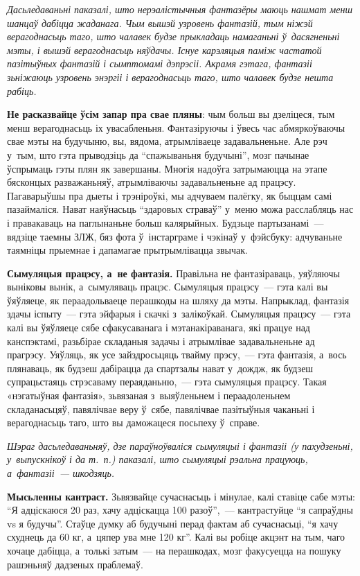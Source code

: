 \emph{Дасьледаваньні паказалі, што нерэалістычныя фантазёры маюць нашмат менш шанцаў дабіцца жаданага. Чым вышэй узровень фантазій, тым ніжэй верагоднасьць таго, што чалавек будзе прыкладаць намаганьні ў~дасягненьні мэты, і вышэй верагоднасьць няўдачы. Існуе карэляцыя паміж частатой пазітыўных фантазій і сымптомамі дэпрэсіі. Акрамя гэтага, фантазіі зьніжаюць узровень энэргіі і верагоднасьць таго, што чалавек будзе нешта рабіць.}

\textbf{Не расказвайце ўсім запар пра свае пляны}: чым больш вы дзеліцеся, тым менш верагоднасьць іх увасабленьня. Фантазіруючы і ўвесь час абмяркоўваючы свае мэты на будучыню, вы, вядома, атрымліваеце задавальненьне. Але рэч у~тым, што гэта прыводзіць да ``спажываньня будучыні'', мозг пачынае ўспрымаць гэты плян як завершаны. Многія надоўга затрымаюцца на этапе бясконцых разважаньняў, атрымліваючы задавальненьне ад працэсу. Пагаварыўшы пра дыеты і трэніроўкі, мы адчуваем палёгку, як быццам самі пазаймаліся. Нават наяўнасьць ``здаровых страваў'' у~меню можа расслабляць нас і правакаваць на паглынаньне больш калярыйных. Будзьце партызанамі~--- вядзіце таемны ЗЛЖ, бяз фота ў~інстарграме і чэкінаў у~фэйсбуку: адчуваньне таямніцы прыемнае і дапамагае прытрымлівацца звычак.

\textbf{Сымуляцыя працэсу, а~не фантазія.} Правільна не фантазіраваць, уяўляючы выніковы вынік, а~сымуляваць працэс. Сымуляцыя працэсу~--- гэта калі вы ўяўляеце, як пераадольваеце перашкоды на шляху да мэты. Напрыклад, фантазія здачы іспыту~--- гэта эйфарыя і скачкі з~залікоўкай. Сымуляцыя працэсу~--- гэта калі вы ўяўляеце сябе сфакусаванага і мэтанакіраванага, які працуе над канспэктамі, разьбірае складаныя задачы і атрымлівае задавальненьне ад прагрэсу. Уяўляць, як усе зайздросьцяць твайму прэсу,~--- гэта фантазія, а~вось плянаваць, як будзеш дабірацца да спартзалы нават у~дождж, як будзеш супрацьстаяць стрэсаваму пераяданьню,~--- гэта сымуляцыя працэсу. Такая «нэгатыўная фантазія», зьвязаная з~выяўленьнем і пераадоленьнем складанасьцяў, павялічвае веру ў~сябе, павялічвае пазітыўныя чаканьні і верагоднасьць таго, што вы даможацеся посьпеху ў~справе.

\emph{Шэраг дасьледаваньняў, дзе параўноўваліся сымуляцыі і фантазіі (у пахудзеньні, у~выпускнікоў і да т.~п.) паказалі, што сымуляцыі рэальна працуюць, а~фантазіі~--- шкодзяць.}


\textbf{Мысьленны кантраст.} Зьвязвайце сучаснасьць і мінулае, калі ставіце сабе мэты: ``Я адціскаюся 20 раз, хачу адціскацца 100 разоў'',~--- кантрастуйце ``я сапраўдны vs я будучы''. Стаўце думку аб будучыні перад фактам аб сучаснасьці, ``я хачу схуднець да 60 кг, а~цяпер ува мне 120 кг''. Калі вы робіце акцэнт на тым, чаго хочаце дабіцца, а~толькі затым~--- на перашкодах, мозг факусуецца на пошуку рашэньняў дадзеных праблемаў.

